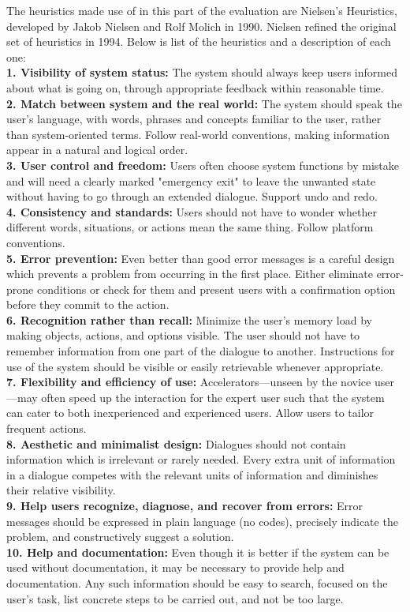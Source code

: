 The heuristics made use of in this part of the evaluation are Nielsen's Heuristics, developed by Jakob Nielsen and Rolf Molich in 1990\cite{tenheuristics}. Nielsen refined the original set of heuristics in 1994\cite{tenheuristics}. Below is list of the heuristics and a description of each one:
\\
\textbf{1. Visibility of system status:}
The system should always keep users informed about what is going on, through appropriate feedback within reasonable time.
\\
\textbf{2. Match between system and the real world:}
The system should speak the user's language, with words, phrases and concepts familiar to the user, rather than system-oriented terms. Follow real-world conventions, making information appear in a natural and logical order.
\\
\textbf{3. User control and freedom:}
Users often choose system functions by mistake and will need a clearly marked "emergency exit" to leave the unwanted state without having to go through an extended dialogue. Support undo and redo.
\\
\textbf{4. Consistency and standards:}
Users should not have to wonder whether different words, situations, or actions mean the same thing. Follow platform conventions.
\\
\textbf{5. Error prevention:}
Even better than good error messages is a careful design which prevents a problem from occurring in the first place. Either eliminate error-prone conditions or check for them and present users with a confirmation option before they commit to the action.
\\
\textbf{6. Recognition rather than recall:}
Minimize the user's memory load by making objects, actions, and options visible. The user should not have to remember information from one part of the dialogue to another. Instructions for use of the system should be visible or easily retrievable whenever appropriate.
\\
\textbf{7. Flexibility and efficiency of use:}
Accelerators—unseen by the novice user—may often speed up the interaction for the expert user such that the system can cater to both inexperienced and experienced users. Allow users to tailor frequent actions.
\\
\textbf{8. Aesthetic and minimalist design:}
Dialogues should not contain information which is irrelevant or rarely needed. Every extra unit of information in a dialogue competes with the relevant units of information and diminishes their relative visibility.
\\
\textbf{9. Help users recognize, diagnose, and recover from errors:}
Error messages should be expressed in plain language (no codes), precisely indicate the problem, and constructively suggest a solution.
\\
\textbf{10. Help and documentation:}
Even though it is better if the system can be used without documentation, it may be necessary to provide help and documentation. Any such information should be easy to search, focused on the user's task, list concrete steps to be carried out, and not be too large.\\

